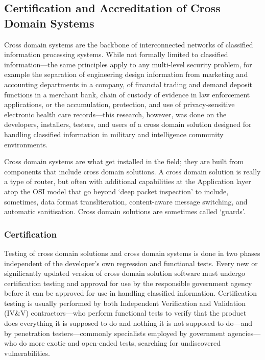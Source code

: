 \documentclass[10pt,letterpaper,conference]{IEEEtran}
\begin{document}
\subsection{Certification and Accreditation of Cross Domain Systems}

Cross domain systems are the backbone of interconnected networks of classified information
processing systems. While not formally limited to classified information---the same principles
apply to any multi-level security problem, for example the separation of engineering design
information from marketing and accounting departments in a company, of financial trading and
demand deposit functions in a merchant bank, chain of custody of evidence in law enforcement
applications, or the accumulation, protection, and use of privacy-sensitive
electronic health care records---this research, however, was done on the developers, installers,
testers, and users of a cross domain solution designed for handling classified information in
military and intelligence community environments.

Cross domain systems are what get installed in the field; they are built from components that
include cross domain solutions. A cross domain solution is really a type of router, but often
with additional capabilities at the Application layer atop the OSI model that go beyond `deep
packet inspection' to include, sometimes, data format transliteration, content-aware message
switching, and automatic sanitisation. Cross domain solutions are sometimes called `guards'.

\subsubsection{Certification}

Testing of cross domain solutions and cross domain systems is done in two phases independent of
the developer's own regression and functional tests. Every new or significantly updated version
of cross domain solution software must undergo certification testing and approval for use
by the responsible government agency before it can be approved for use in handling classified
information. Certification testing is usually performed by both Independent Verification and
Validation (IV\&V) contractors---who perform functional tests to verify that the product
does everything it is supposed to do and nothing it is not supposed to do---and by
penetration testers---commonly specialists employed by government agencies---who do more exotic
and open-ended tests, searching for undiscovered vulnerabilities.
\end{document}
